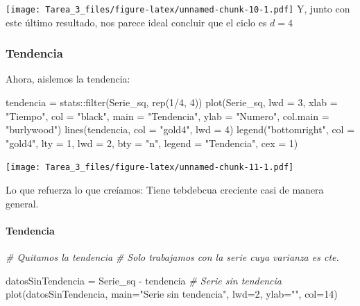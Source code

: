 \documentclass[
]{article}
\newenvironment{Shaded}{\begin{snugshade}}{\end{snugshade}}
\newcommand{\AttributeTok}[1]{\textcolor[rgb]{0.77,0.63,0.00}{#1}}
\newcommand{\CommentTok}[1]{\textcolor[rgb]{0.56,0.35,0.01}{\textit{#1}}}
\newcommand{\DecValTok}[1]{\textcolor[rgb]{0.00,0.00,0.81}{#1}}
\newcommand{\FunctionTok}[1]{\textcolor[rgb]{0.00,0.00,0.00}{#1}}
\newcommand{\NormalTok}[1]{#1}
\newcommand{\OtherTok}[1]{\textcolor[rgb]{0.56,0.35,0.01}{#1}}
\newcommand{\SpecialCharTok}[1]{\textcolor[rgb]{0.00,0.00,0.00}{#1}}
\newcommand{\StringTok}[1]{\textcolor[rgb]{0.31,0.60,0.02}{#1}}
\begin{document}
\texttt{[image: Tarea\_3\_files/figure-latex/unnamed-chunk-10-1.pdf]} Y,
junto con este último resultado, nos parece ideal concluir que el ciclo
es \(d=4\)

\hypertarget{tendencia-1}{%
\subsubsection{Tendencia}\label{tendencia-1}}

Ahora, aislemos la tendencia:

\begin{Shaded}
\begin{Highlighting}[]
\NormalTok{tendencia }\OtherTok{=}\NormalTok{ stats}\SpecialCharTok{::}\FunctionTok{filter}\NormalTok{(Serie\_sq, }\FunctionTok{rep}\NormalTok{(}\DecValTok{1}\SpecialCharTok{/}\DecValTok{4}\NormalTok{, }\DecValTok{4}\NormalTok{))}
\FunctionTok{plot}\NormalTok{(Serie\_sq, }\AttributeTok{lwd =} \DecValTok{3}\NormalTok{, }\AttributeTok{xlab =} \StringTok{"Tiempo"}\NormalTok{, }\AttributeTok{col =} \StringTok{"black"}\NormalTok{,}
     \AttributeTok{main =} \StringTok{"Tendencia"}\NormalTok{,}
     \AttributeTok{ylab =} \StringTok{"Numero"}\NormalTok{, }\AttributeTok{col.main =} \StringTok{"burlywood"}\NormalTok{)}
\FunctionTok{lines}\NormalTok{(tendencia, }\AttributeTok{col =} \StringTok{"gold4"}\NormalTok{, }\AttributeTok{lwd =} \DecValTok{4}\NormalTok{)}
\FunctionTok{legend}\NormalTok{(}\StringTok{"bottomright"}\NormalTok{, }\AttributeTok{col =} \StringTok{"gold4"}\NormalTok{, }\AttributeTok{lty =} \DecValTok{1}\NormalTok{, }\AttributeTok{lwd =} \DecValTok{2}\NormalTok{, }\AttributeTok{bty =} \StringTok{"n"}\NormalTok{,}
       \AttributeTok{legend =} \StringTok{"Tendencia"}\NormalTok{, }\AttributeTok{cex =} \DecValTok{1}\NormalTok{)}
\end{Highlighting}
\end{Shaded}

\texttt{[image: Tarea\_3\_files/figure-latex/unnamed-chunk-11-1.pdf]}

Lo que refuerza lo que creíamos: Tiene tebdebcua creciente casi de
manera general.

\hypertarget{tendencia-2}{%
\paragraph{Tendencia}\label{tendencia-2}}

\begin{Shaded}
\begin{Highlighting}[]
\CommentTok{\# Quitamos la tendencia}
\CommentTok{\# Solo trabajamos con la serie cuya varianza es cte. }

\NormalTok{datosSinTendencia }\OtherTok{=}\NormalTok{ Serie\_sq }\SpecialCharTok{{-}}\NormalTok{ tendencia }\CommentTok{\# Serie sin tendencia}
\FunctionTok{plot}\NormalTok{(datosSinTendencia, }\AttributeTok{main=}\StringTok{"Serie sin tendencia"}\NormalTok{, }\AttributeTok{lwd=}\DecValTok{2}\NormalTok{, }\AttributeTok{ylab=}\StringTok{""}\NormalTok{, }\AttributeTok{col=}\DecValTok{14}\NormalTok{)}
\end{Highlighting}
\end{Shaded}
\end{document}

